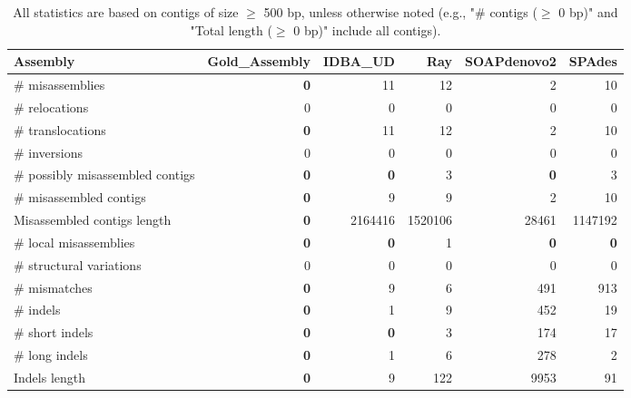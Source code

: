 \documentclass[12pt,a4paper]{article}
\begin{document}
\begin{table}[ht]
\begin{center}
\caption{All statistics are based on contigs of size $\geq$ 500 bp, unless otherwise noted (e.g., "\# contigs ($\geq$ 0 bp)" and "Total length ($\geq$ 0 bp)" include all contigs).}
\begin{tabular}{|l*{5}{|r}|}
\hline
Assembly & Gold\_Assembly & IDBA\_UD & Ray & SOAPdenovo2 & SPAdes \\ \hline
\# misassemblies & {\bf 0} & 11 & 12 & 2 & 10 \\ \hline
\hspace{5mm}\# relocations & 0 & 0 & 0 & 0 & 0 \\ \hline
\hspace{5mm}\# translocations & {\bf 0} & 11 & 12 & 2 & 10 \\ \hline
\hspace{5mm}\# inversions & 0 & 0 & 0 & 0 & 0 \\ \hline
\# possibly misassembled contigs & {\bf 0} & {\bf 0} & 3 & {\bf 0} & 3 \\ \hline
\# misassembled contigs & {\bf 0} & 9 & 9 & 2 & 10 \\ \hline
Misassembled contigs length & {\bf 0} & 2164416 & 1520106 & 28461 & 1147192 \\ \hline
\# local misassemblies & {\bf 0} & {\bf 0} & 1 & {\bf 0} & {\bf 0} \\ \hline
\# structural variations & 0 & 0 & 0 & 0 & 0 \\ \hline
\# mismatches & {\bf 0} & 9 & 6 & 491 & 913 \\ \hline
\# indels & {\bf 0} & 1 & 9 & 452 & 19 \\ \hline
\hspace{5mm}\# short indels & {\bf 0} & {\bf 0} & 3 & 174 & 17 \\ \hline
\hspace{5mm}\# long indels & {\bf 0} & 1 & 6 & 278 & 2 \\ \hline
Indels length & {\bf 0} & 9 & 122 & 9953 & 91 \\ \hline
\end{tabular}
\end{center}
\end{table}
\end{document}
